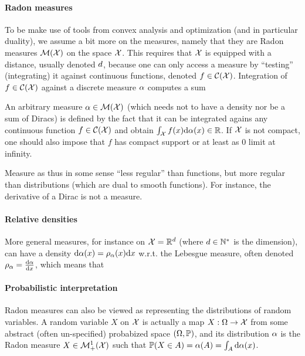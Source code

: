 \paragraph{Radon measures}

To be make use of tools from convex analysis and optimization (and in particular duality), we assume a bit more on the measures, namely that they are Radon measures $\mathcal{M}(\mathcal{X})$ on the space $\mathcal{X}$. This 
requires that $\mathcal{X}$ is equipped with a distance, usually denoted $d$, because one can only access a measure by ``testing'' (integrating) it against continuous functions, denoted $f \in \mathcal{C}(\mathcal{X})$. 
%
Integration of $f \in \mathcal{C}(\mathcal{X})$ against a discrete measure $\alpha$ computes a sum

An arbitrary measure $\alpha \in \mathcal{M}(\mathcal{X})$ (which needs not to have a density nor be a sum of Diracs) is defined by the fact that it can be integrated agains any continuous function $f \in \mathcal{C}(\mathcal{X})$ and obtain $\int_{\mathcal{X}} f(x) \mathrm{d}\alpha(x) \in \mathbb{R}$. If $\mathcal{X}$ is not compact, one should also impose that $f$ has compact support or at least as $0$ limit at infinity. 

Measure as thus in some sense ``less regular'' than functions, but more regular than distributions (which are dual to smooth functions). For instance, the derivative of a Dirac is not a measure.



\paragraph{Relative densities}

More general measures, for instance on $\mathcal{X}=\mathbb{R}^d$ (where $d \in \mathbb{N}^*$ is the dimension), can have a density $\mathrm{d}\alpha(x)=\rho_{\alpha}(x)\mathrm{d} x$ w.r.t. the Lebesgue measure, often denoted $\rho_{\alpha} = \frac{\mathrm{d}\alpha}{\mathrm{d} x}$, which means that 



\paragraph{Probabilistic interpretation}

Radon measures can also be viewed as representing the distributions of random variables. A random variable $X$ on $\mathcal{X}$ is actually a map $X : \Omega \rightarrow \mathcal{X}$ from some abstract (often un-specified) probabized space $(\Omega,\mathbb{P})$, and its distribution $\alpha$ is the Radon measure $X \in \mathcal{M}_+^1(\mathcal{X})$ such that $\mathbb{P}(X \in A) = \alpha(A)=\int_A \mathrm{d}\alpha(x)$.


